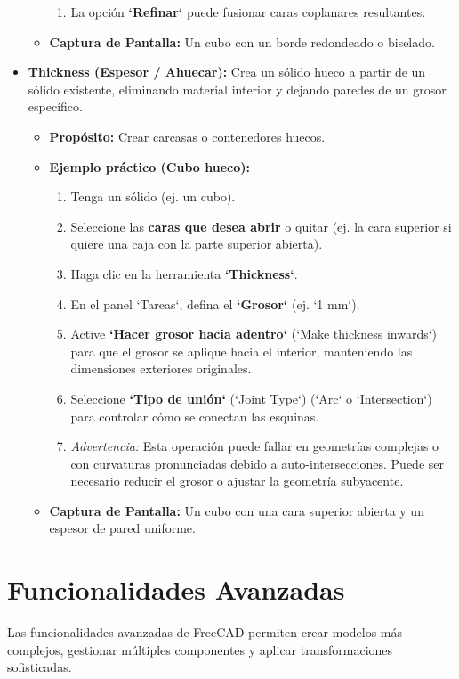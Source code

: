 \documentclass[12pt]{article}
\begin{document}
\begin{itemize}[label=\textbullet]
\begin{itemize}[label=\textendash]
\begin{enumerate}[label=\arabic*)]
            \item La opción \textbf{`Refinar`} puede fusionar caras coplanares resultantes.
        \end{enumerate}
        \item \textbf{Captura de Pantalla:} Un cubo con un borde redondeado o biselado.
    \end{itemize}
    \item \textbf{Thickness (Espesor / Ahuecar):} Crea un sólido hueco a partir de un sólido existente, eliminando material interior y dejando paredes de un grosor específico.
    \begin{itemize}[label=\textendash]
        \item \textbf{Propósito:} Crear carcasas o contenedores huecos.
        \item \textbf{Ejemplo práctico (Cubo hueco):}
        \begin{enumerate}[label=\arabic*)]
            \item Tenga un sólido (ej. un cubo).
            \item Seleccione las \textbf{caras que desea abrir} o quitar (ej. la cara superior si quiere una caja con la parte superior abierta).
            \item Haga clic en la herramienta \textbf{`Thickness`}.
            \item En el panel `Tareas`, defina el \textbf{`Grosor`} (ej. `1 mm`).
            \item Active \textbf{`Hacer grosor hacia adentro`} (`Make thickness inwards`) para que el grosor se aplique hacia el interior, manteniendo las dimensiones exteriores originales.
            \item Seleccione \textbf{`Tipo de unión`} (`Joint Type`) (`Arc` o `Intersection`) para controlar cómo se conectan las esquinas.
            \item \textit{Advertencia:} Esta operación puede fallar en geometrías complejas o con curvaturas pronunciadas debido a auto-intersecciones. Puede ser necesario reducir el grosor o ajustar la geometría subyacente.
        \end{enumerate}
        \item \textbf{Captura de Pantalla:} Un cubo con una cara superior abierta y un espesor de pared uniforme.
    \end{itemize}
\end{itemize}
\newpage

\section{Funcionalidades Avanzadas}
Las funcionalidades avanzadas de FreeCAD permiten crear modelos más complejos, gestionar múltiples componentes y aplicar transformaciones sofisticadas.
\end{document}
